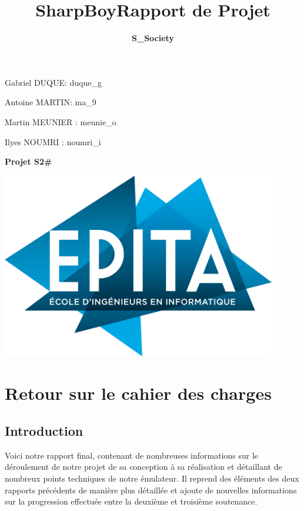 \documentclass[12pt, a4paper]{article}
\title{\Huge \bf SharpBoy}
\author{\large \bf S\_Society }
\title{\large \bf Rapport de Projet}
\begin{document}
\maketitle


\bigskip
\large Gabriel DUQUE: duque\_g

\bigskip
\large Antoine MARTIN: ma\_9

\bigskip
\large Martin MEUNIER : meunie\_o

\bigskip
\large Ilyes NOUMRI : noumri\_i

\bigskip
\large {\textbf{Projet S2\#}}

\bigskip 
\bigskip
\bigskip


\begin{center}
\includegraphics[width= 12cm]{logo-epita-hd.png} 
\end{center}

\pagebreak

\tableofcontents 

\linespread{1.4}
\pagebreak

\lstset{language=Caml}

\pagebreak

\large
\section{Retour sur le cahier des charges}
\large



\subsection{Introduction}
Voici notre rapport final, contenant de nombreuses informations sur le déroulement de notre projet de sa conception à sa réalisation et détaillant de nombreux points techniques de notre émulateur. Il reprend des éléments des deux rapports précédents de manière plus détaillée et ajoute de nouvelles informations sur la progression effectuée entre la deuxième et troisième soutenance. 
\end{document}
